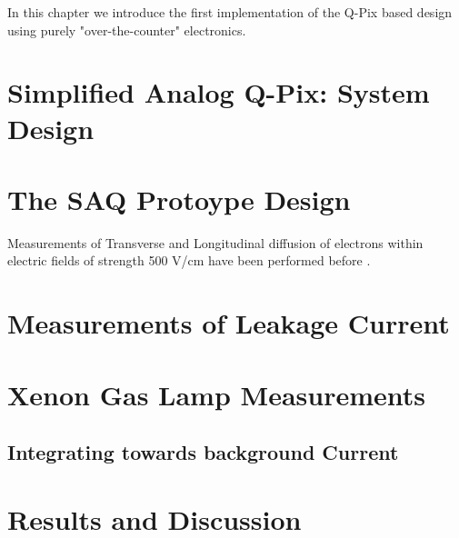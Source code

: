In this chapter we introduce the first implementation of the Q-Pix based design using purely "over-the-counter" electronics.


\section{Simplified Analog Q-Pix: System Design}

\section{The SAQ Protoype Design}

Measurements of Transverse and Longitudinal diffusion of electrons within electric fields of strength 500 V/cm have been performed before \citep{lar_diffusion_measurement_LI2016160}.

\section{Measurements of Leakage Current}

\section{Xenon Gas Lamp Measurements}

\subsection{Integrating towards background Current}

\section{Results and Discussion}
